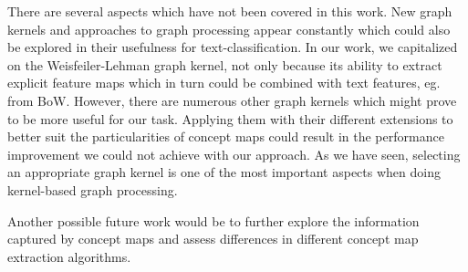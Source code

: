 
There are several aspects which have not been covered in this work.
New graph kernels and approaches to graph processing appear constantly which could also be explored in their usefulness for text-classification.
In our work, we capitalized on the Weisfeiler-Lehman graph kernel, not only because its ability to extract explicit feature maps which in turn could be combined with text features, eg. from BoW.
However, there are numerous other graph kernels which might prove to be more useful for our task.
Applying them with their different extensions to better suit the particularities of concept maps could result in the performance improvement we could not achieve with our approach.
As we have seen, selecting an appropriate graph kernel is one of the most important aspects when doing kernel-based graph processing.

Another possible future work would be to further explore the information captured by concept maps and assess differences in different concept map extraction algorithms.

